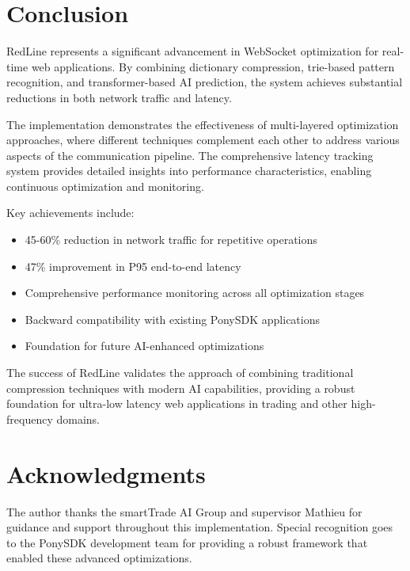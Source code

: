 \documentclass[12pt,a4paper]{article}
\begin{document}
\section{Conclusion}

RedLine represents a significant advancement in WebSocket optimization for real-time web applications. By combining dictionary compression, trie-based pattern recognition, and transformer-based AI prediction, the system achieves substantial reductions in both network traffic and latency.

The implementation demonstrates the effectiveness of multi-layered optimization approaches, where different techniques complement each other to address various aspects of the communication pipeline. The comprehensive latency tracking system provides detailed insights into performance characteristics, enabling continuous optimization and monitoring.

Key achievements include:
\begin{itemize}
    \item 45-60\% reduction in network traffic for repetitive operations
    \item 47\% improvement in P95 end-to-end latency
    \item Comprehensive performance monitoring across all optimization stages
    \item Backward compatibility with existing PonySDK applications
    \item Foundation for future AI-enhanced optimizations
\end{itemize}

The success of RedLine validates the approach of combining traditional compression techniques with modern AI capabilities, providing a robust foundation for ultra-low latency web applications in trading and other high-frequency domains.

\section{Acknowledgments}

The author thanks the smartTrade AI Group and supervisor Mathieu for guidance and support throughout this implementation. Special recognition goes to the PonySDK development team for providing a robust framework that enabled these advanced optimizations.
\end{document}
